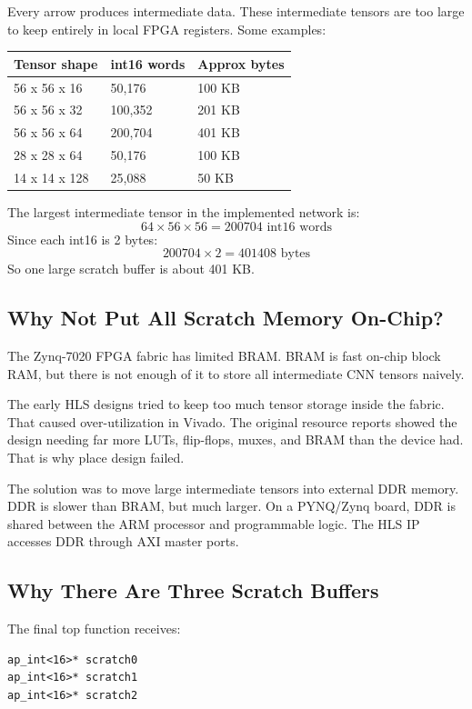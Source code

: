 \documentclass[11pt]{article}
\begin{document}
Every arrow produces intermediate data.
These intermediate tensors are too large to keep entirely in local FPGA registers.
Some examples:

\begin{center}
\begin{tabular}{lll}
\toprule
Tensor shape & int16 words & Approx bytes \\
\midrule
56 x 56 x 16 & 50,176 & 100 KB \\
56 x 56 x 32 & 100,352 & 201 KB \\
56 x 56 x 64 & 200,704 & 401 KB \\
28 x 28 x 64 & 50,176 & 100 KB \\
14 x 14 x 128 & 25,088 & 50 KB \\
\bottomrule
\end{tabular}
\end{center}

The largest intermediate tensor in the implemented network is:
\[
  64 \times 56 \times 56 = 200704 \text{ int16 words}
\]
Since each int16 is 2 bytes:
\[
  200704 \times 2 = 401408 \text{ bytes}
\]
So one large scratch buffer is about 401 KB.

\subsection{Why Not Put All Scratch Memory On-Chip?}

The Zynq-7020 FPGA fabric has limited BRAM.
BRAM is fast on-chip block RAM, but there is not enough of it to store all intermediate CNN tensors naively.

The early HLS designs tried to keep too much tensor storage inside the fabric.
That caused over-utilization in Vivado.
The original resource reports showed the design needing far more LUTs, flip-flops, muxes, and BRAM than the device had.
That is why place design failed.

The solution was to move large intermediate tensors into external DDR memory.
DDR is slower than BRAM, but much larger.
On a PYNQ/Zynq board, DDR is shared between the ARM processor and programmable logic.
The HLS IP accesses DDR through AXI master ports.

\subsection{Why There Are Three Scratch Buffers}

The final top function receives:

\begin{lstlisting}
ap_int<16>* scratch0
ap_int<16>* scratch1
ap_int<16>* scratch2
\end{lstlisting}
\end{document}
